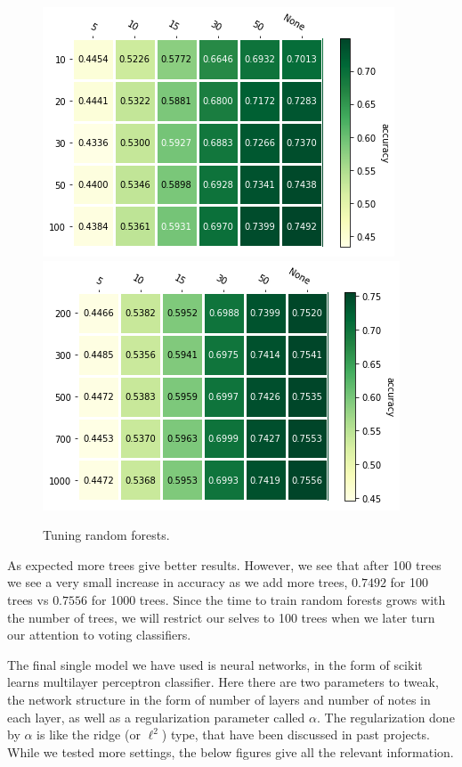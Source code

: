 \documentclass[parskip=half]{scrartcl}
\theoremstyle{definition}
\theoremstyle{remark}
\begin{document}
\begin{figure}[H]
\caption{Tuning random forests.}
\centering
\includegraphics[scale=0.6]{images/forrest_params1.png}
\includegraphics[scale=0.6]{images/forrest_params2.png}
\end{figure}

As expected more trees give better results. 
However, we see that after 100 trees we see a very small increase in accuracy as we add more trees, $0.7492$ for 100 trees vs $0.7556$ for 1000 trees. 
Since the time to train random forests grows with the number of trees, we will restrict our selves to 100 trees when we later turn our attention to voting classifiers. 

The final single model we have used is neural networks, in the form of scikit learns multilayer perceptron classifier. 
Here there are two parameters to tweak, the network structure in the form of number of layers and number of notes in each layer, as well as a regularization parameter called $\alpha$.
The regularization done by $\alpha$ is like the ridge (or $\ell^2$) type, that have been discussed in past projects. 
While we tested more settings, the below figures give all the relevant information.
\end{document}
